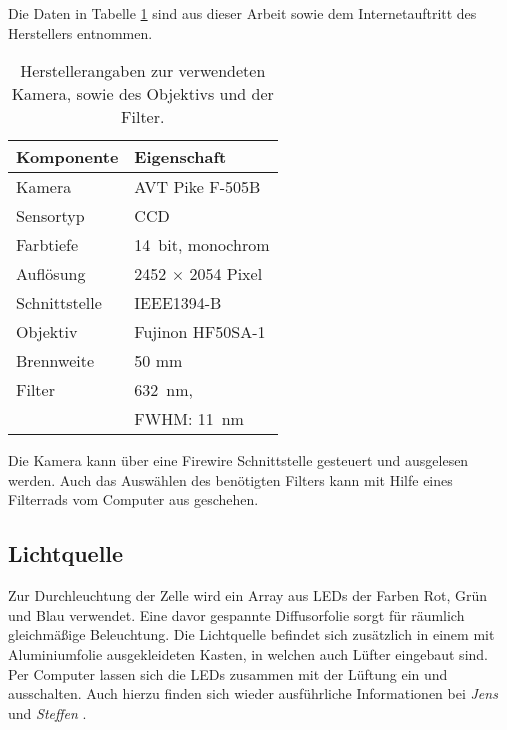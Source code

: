 Die Daten in Tabelle \ref{tab:cam} sind aus dieser Arbeit sowie dem Internetauftritt des Herstellers \citep{pike_sheet} entnommen. 
\begin{table}[b]
 \begin{tabularx}{\linewidth}{X|X}
  Komponente	& Eigenschaft \\
  \hline\hline
  Kamera	& AVT Pike F-505B \\
  Sensortyp	& CCD \\
  Farbtiefe	& \SI{14}{bit}, monochrom \\
  Auflösung	& 2452 $\times$ 2054 Pixel \\
  Schnittstelle	& IEEE1394-B \\
  \hline
  Objektiv	& Fujinon HF50SA-1 \\
  Brennweite	& 50 mm \\
  \hline
  Filter	& \SI{632}{\nano\meter}, \\
		& FWHM: \SI{11}{\nano\meter} 
 \end{tabularx}
 \caption{Herstellerangaben zur verwendeten Kamera, sowie des Objektivs und der Filter.}
 \label{tab:cam}
\end{table}
Die Kamera kann über eine Firewire Schnittstelle gesteuert und ausgelesen werden. Auch das Auswählen des benötigten Filters kann mit Hilfe eines Filterrads
vom Computer aus geschehen.


\subsection{Lichtquelle}
\label{sec:light}
Zur Durchleuchtung der Zelle wird ein Array aus LEDs der Farben Rot, Grün und Blau verwendet. Eine davor gespannte Diffusorfolie sorgt für räumlich gleichmäßige Beleuchtung. Die Lichtquelle befindet sich zusätzlich in einem mit Aluminiumfolie ausgekleideten Kasten, in welchen auch Lüfter eingebaut sind. Per Computer lassen sich die LEDs zusammen mit der Lüftung ein und ausschalten. Auch hierzu finden sich wieder ausführliche Informationen bei \textit{Jens} \cite{buchner} und \textit{Steffen} \cite{heberle}.



